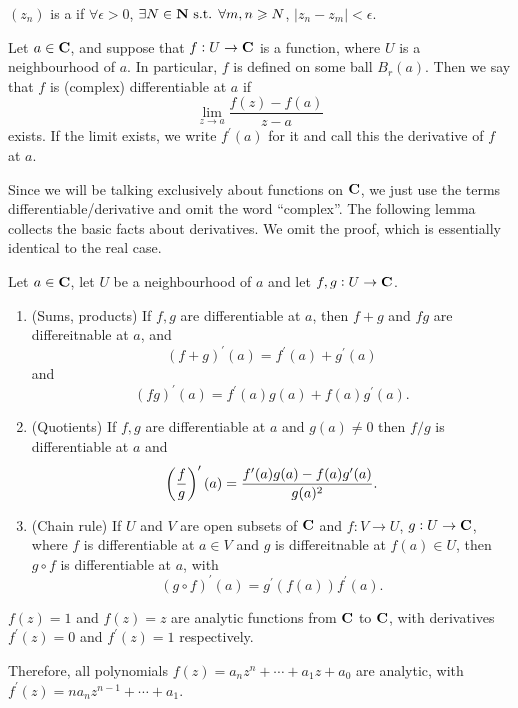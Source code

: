 \begin{definition}
$(z_n)$ is a  if $\forall\epsilon>0$, $\exists N\in\mathbf N\text{ s.t. }\forall m,n\geqslant N$, $|z_n-z_m|<\epsilon$.
\end{definition}


\begin{definition}
Let $a\in\mathbf C$, and suppose that $f:U\to\mathbf C$ is a function, where $U$ is a neighbourhood of $a$. In particular, $f$ is defined on some ball $B_r(a)$. Then we say that $f$ is (complex) differentiable at $a$ if
\[\lim_{z\to a}\frac{f(z)-f(a)}{z-a}\]
exists. If the limit exists, we write $f^\prime(a)$ for it and call this the derivative of $f$ at $a$.
\end{definition}

Since we will be talking exclusively about functions on $\mathbf C$, we just use the terms differentiable/derivative and omit the word ``complex''. The following lemma collects the basic facts about derivatives. We omit the proof, which is essentially identical to the real case.

\begin{lemma}
Let $a\in\mathbf C$, let $U$ be a neighbourhood of $a$ and let $f,g:U\to\mathbf C$.
\begin{enumerate}[label=(\arabic*)]
\item (Sums, products) If $f,g$ are differentiable at $a$, then $f+g$ and $fg$ are differeitnable at $a$, and
\[(f+g)^\prime(a)=f^\prime(a)+g^\prime(a)\]
and
\[(fg)^\prime(a)=f^\prime(a)g(a)+f(a)g^\prime(a).\]
\item (Quotients) If $f,g$ are differentiable at $a$ and $g(a)\neq0$ then $f/g$ is differentiable at $a$ and
\[\left(\frac{f}{g}\right)^\prime(a)=\frac{f^\prime(a)g(a)-f(a)g^\prime(a)}{g(a)^2}.\]
\item (Chain rule) If $U$ and $V$ are open subsets of $\mathbf C$ and $f:V\to U$, $g:U\to\mathbf C$, where $f$ is differentiable at $a\in V$ and $g$ is differeitnable at $f(a)\in U$, then $g\circ f$ is differentiable at $a$, with
\[(g\circ f)^\prime(a)=g^\prime(f(a))f^\prime(a).\]
\end{enumerate}
\end{lemma}

\begin{example}
$f(z)=1$ and $f(z)=z$ are analytic functions from $\mathbf C$ to $\mathbf C$, with derivatives $f^\prime(z)=0$ and $f^\prime(z)=1$ respectively.

Therefore, all polynomials $f(z)=a_nz^n+\cdots+a_1z+a_0$ are analytic, with $f^\prime(z)=na_nz^{n-1}+\cdots+a_1$.
\end{example}

